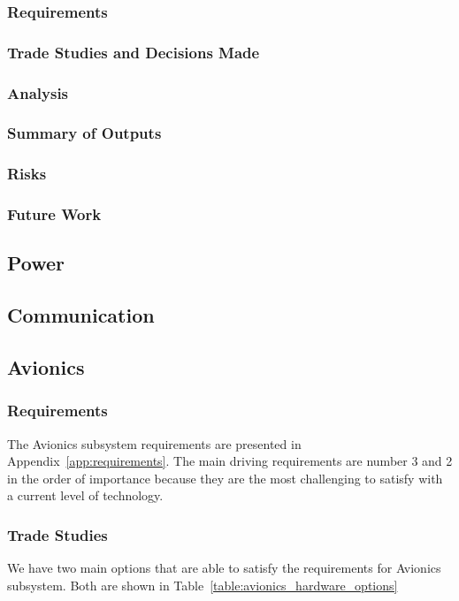 \documentclass[12pt]{article}
\begin{document}
			\subsubsection{Requirements}
			\subsubsection{Trade Studies and Decisions Made}
			\subsubsection{Analysis}
			\subsubsection{Summary of Outputs}
			\subsubsection{Risks}
			\subsubsection{Future Work}
		\subsection{Power}
		\subsection{Communication}
		\subsection{Avionics}
			\subsubsection{Requirements}
The Avionics subsystem requirements are presented in Appendix~\ref{app:requirements}.  The main driving requirements are number 3 and 2 in the order of importance because they are the most challenging to satisfy with a current level of technology.

			\subsubsection{Trade Studies}
We have two main options that are able to satisfy the requirements for Avionics subsystem. Both are shown in Table~\ref{table:avionics_hardware_options}
\end{document}
